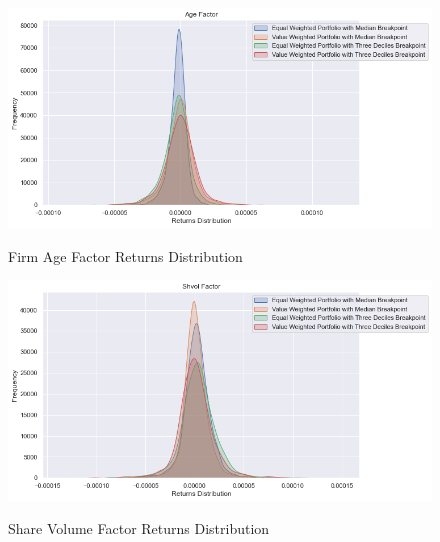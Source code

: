 \begin{figure}[H]
	\caption{Firm Age Factor Returns Distribution}
	\centering
	\includegraphics[scale=.63]{../../output/figures/age.png}
	\label{fig:age}
\end{figure}

\begin{figure}[H]
	\caption{Share Volume Factor Returns Distribution}
	\centering
	\includegraphics[scale=.63]{../../output/figures/shvol.png}
	\label{fig:shvol}
\end{figure}

%





%






